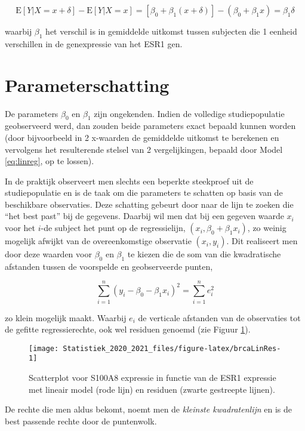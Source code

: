 \documentclass[
  12pt,dutch,coursenotes]{book}
\theoremstyle{definition}
\theoremstyle{definition}
\theoremstyle{definition}
\theoremstyle{remark}
\begin{document}
\[\text{E}\left[Y|X=x+\delta\right]-\text{E}\left[Y|X=x\right]= \left[\beta_0+\beta_1(x+\delta)\right]-(\beta_0+\beta_1x)=\beta_1\delta\]

waarbij \(\beta_1\) het verschil is in gemiddelde uitkomst tussen subjecten die 1 eenheid verschillen in de genexpressie van het ESR1 gen.

\hypertarget{parameterschatting}{%
\section{Parameterschatting}\label{parameterschatting}}

De parameters \(\beta_0\) en \(\beta_1\) zijn ongekenden. Indien de volledige
studiepopulatie geobserveerd werd, dan zouden beide parameters exact
bepaald kunnen worden (door bijvoorbeeld in 2 x-waarden de gemiddelde uitkomst te berekenen en vervolgens het resulterende stelsel van 2 vergelijkingen, bepaald door Model \eqref{eq:linreg}, op te lossen).

In de praktijk observeert men slechts een beperkte steekproef uit de studiepopulatie en is de taak om die parameters te schatten op basis van de beschikbare observaties.
Deze schatting gebeurt door naar de lijn te zoeken die ``het
best past'' bij de gegevens. Daarbij wil men dat bij een gegeven waarde \(x_i\) voor het \(i\)-de subject het punt op de regressielijn, \((x_i, \beta_0 + \beta_1 x_i)\), zo weinig mogelijk afwijkt van de overeenkomstige observatie \((x_i, y_i)\). Dit realiseert men door deze waarden voor \(\beta_0\) en \(\beta_1\) te
kiezen die de som van die kwadratische afstanden tussen de voorspelde en
geobserveerde punten,

\[\sum_{i=1}^n (y_i-\beta_0-\beta_1 x_i)^2=\sum_{i=1}^n e_i^2\]

zo klein mogelijk maakt. Waarbij \(e_i\) de verticale afstanden van de observaties tot de gefitte regressierechte, ook wel residuen genoemd (zie Figuur \ref{fig:brcaLinRes}).

\begin{figure}

{\centering \texttt{[image: Statistiek\_2020\_2021\_files/figure-latex/brcaLinRes-1]} 

}

\caption{Scatterplot voor S100A8 expressie in functie van de ESR1 expressie met lineair model (rode lijn) en residuen (zwarte gestreepte lijnen).}\label{fig:brcaLinRes}
\end{figure}

De rechte die men aldus bekomt, noemt men de
\emph{kleinste kwadratenlijn} en is de best passende rechte door de puntenwolk.
\end{document}
